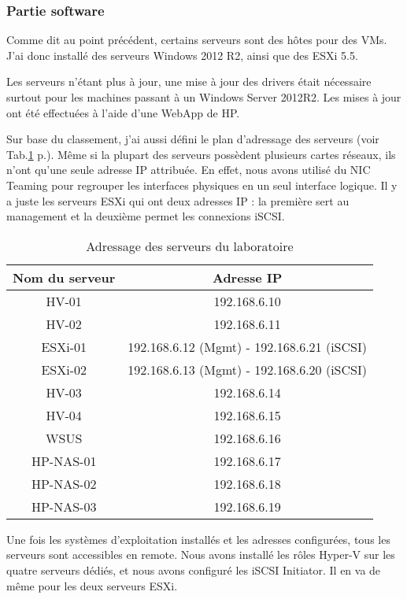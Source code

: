\subsubsection{Partie software}
Comme dit au point précédent, certains serveurs sont des hôtes pour des VMs.
J'ai donc installé des serveurs Windows 2012 R2, ainsi que des ESXi 5.5.

Les serveurs n'étant plus à jour, une mise à jour des drivers était nécessaire surtout pour les machines passant à un Windows Server 2012R2.
Les mises à jour ont été effectuées à l'aide d'une WebApp de HP.

Sur base du classement, j'ai aussi défini le plan d'adressage des serveurs (voir Tab.\ref{tab:addIP} p.\pageref{tab:addIP}).
Même si la plupart des serveurs possèdent plusieurs cartes réseaux, ils n'ont qu'une seule adresse IP attribuée.
En effet, nous avons utilisé du NIC Teaming pour regrouper les interfaces physiques en un seul interface logique.
Il y a juste les serveurs ESXi qui ont deux adresses IP : la première sert au management et la deuxième permet les connexions iSCSI.
\begin{table}
\centering
\begin{tabular}{cc}
\toprule
Nom du serveur & Adresse IP \\
\midrule
HV-01 & 192.168.6.10 \\ 
HV-02 & 192.168.6.11 \\ 
ESXi-01 & 192.168.6.12 (Mgmt) - 192.168.6.21 (iSCSI) \\ 
ESXi-02 & 192.168.6.13 (Mgmt) - 192.168.6.20 (iSCSI) \\ 
HV-03 & 192.168.6.14 \\ 
HV-04 & 192.168.6.15 \\ 
WSUS & 192.168.6.16 \\ 
HP-NAS-01 & 192.168.6.17 \\ 
HP-NAS-02 & 192.168.6.18 \\ 
HP-NAS-03 & 192.168.6.19 \\
\bottomrule
\end{tabular}
\caption{Adressage des serveurs du laboratoire}
\label{tab:addIP}
\end{table}

Une fois les systèmes d'exploitation installés et les adresses configurées, tous les serveurs sont accessibles en remote. 
Nous avons installé les rôles Hyper-V sur les quatre serveurs dédiés, et nous avons configuré les iSCSI Initiator. 
Il en va de même pour les deux serveurs ESXi.

